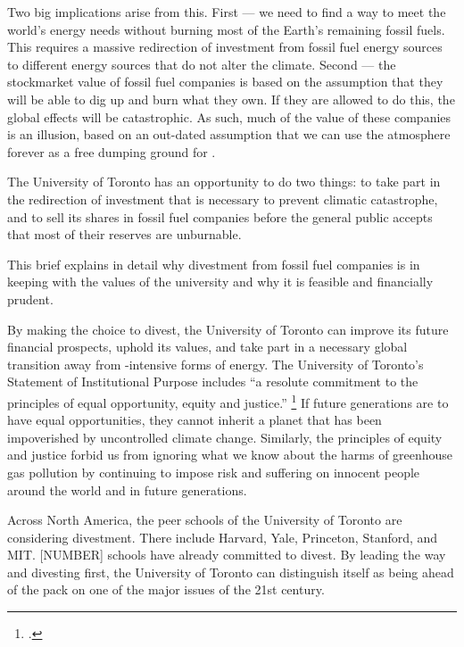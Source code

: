 Two big implications arise from this. 
First --- we need to find a way to meet the world's energy needs without burning most of the Earth's remaining fossil fuels. 
This requires a massive redirection of investment from fossil fuel energy sources to different energy sources that do not alter the climate.
Second --- the stockmarket value of fossil fuel companies is based on the assumption that they will be able to dig up and burn what they own.
If they are allowed to do this, the global effects will be catastrophic.
As such, much of the value of these companies is an illusion, based on an out-dated assumption that we can use the atmosphere forever as a free dumping ground for .



The University of Toronto has an opportunity to do two things: to take part in the redirection of investment that is necessary to prevent climatic catastrophe, and to sell its shares in fossil fuel companies before the general public accepts that most of their reserves are unburnable.



This brief explains in detail why divestment from fossil fuel companies is in keeping with the values of the university and why it is feasible and financially prudent.



By making the choice to divest, the University of Toronto can improve its future financial prospects, uphold its values, and take part in a necessary global transition away from -intensive forms of energy.
The University of Toronto's Statement of Institutional Purpose includes ``a resolute commitment to the principles of equal opportunity, equity and justice.'' \footcite{InstitutionalPurpose}
If future generations are to have equal opportunities, they cannot inherit a planet that has been impoverished by uncontrolled climate change.
Similarly, the principles of equity and justice forbid us from ignoring what we know about the harms of greenhouse gas pollution by continuing to impose risk and suffering on innocent people around the world and in future generations.


Across North America, the peer schools of the University of Toronto are considering divestment.
There include Harvard, Yale, Princeton, Stanford, and MIT.
[NUMBER] schools have already committed to divest.
By leading the way and divesting first, the University of Toronto can distinguish itself as being ahead of the pack on one of the major issues of the 21st century.



